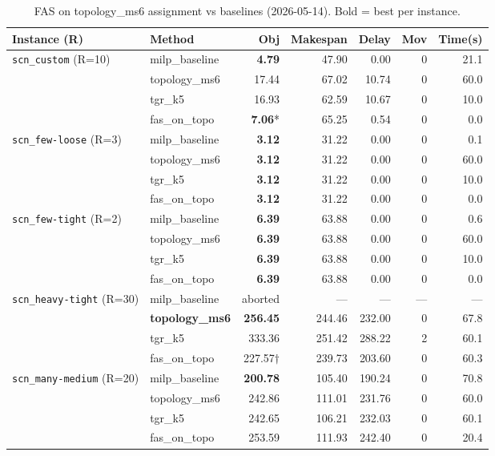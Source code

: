 \begin{table}[h]
\centering
\caption{FAS on topology\_ms6 assignment vs baselines (2026-05-14).  Bold = best per instance.}
\label{tab:exp03}
\begin{tabular}{llrrrrr}
\toprule
Instance (R) & Method & Obj & Makespan & Delay & Mov & Time(s) \\
\midrule
\multirow{4}{*}{\texttt{scn\_custom} (R=10)}
 & milp\_baseline & \textbf{4.79}  &  47.90 &  0.00 & 0 & 21.1 \\
 & topology\_ms6  & 17.44          &  67.02 & 10.74 & 0 & 60.0 \\
 & tgr\_k5        & 16.93          &  62.59 & 10.67 & 0 & 10.0 \\
 & fas\_on\_topo  & \textbf{7.06}* &  65.25 &  0.54 & 0 &  0.0 \\
\midrule
\multirow{4}{*}{\texttt{scn\_few-loose} (R=3)}
 & milp\_baseline & \textbf{3.12}  &  31.22 &  0.00 & 0 &  0.1 \\
 & topology\_ms6  & \textbf{3.12}  &  31.22 &  0.00 & 0 & 60.0 \\
 & tgr\_k5        & \textbf{3.12}  &  31.22 &  0.00 & 0 & 10.0 \\
 & fas\_on\_topo  & \textbf{3.12}  &  31.22 &  0.00 & 0 &  0.0 \\
\midrule
\multirow{4}{*}{\texttt{scn\_few-tight} (R=2)}
 & milp\_baseline & \textbf{6.39}  &  63.88 &  0.00 & 0 &  0.6 \\
 & topology\_ms6  & \textbf{6.39}  &  63.88 &  0.00 & 0 & 60.0 \\
 & tgr\_k5        & \textbf{6.39}  &  63.88 &  0.00 & 0 & 10.0 \\
 & fas\_on\_topo  & \textbf{6.39}  &  63.88 &  0.00 & 0 &  0.0 \\
\midrule
\multirow{3}{*}{\texttt{scn\_heavy-tight} (R=30)}
 & milp\_baseline & aborted         &     — &     — & — &    — \\
 & \textbf{topology\_ms6} & \textbf{256.45} & 244.46 & 232.00 & 0 & 67.8 \\
 & tgr\_k5        & 333.36          & 251.42 & 288.22 & 2 & 60.1 \\
 & fas\_on\_topo  & 227.57$\dagger$ & 239.73 & 203.60 & 0 & 60.3 \\
\midrule
\multirow{4}{*}{\texttt{scn\_many-medium} (R=20)}
 & milp\_baseline & \textbf{200.78} & 105.40 & 190.24 & 0 & 70.8 \\
 & topology\_ms6  & 242.86          & 111.01 & 231.76 & 0 & 60.0 \\
 & tgr\_k5        & 242.65          & 106.21 & 232.03 & 0 & 60.1 \\
 & fas\_on\_topo  & 253.59          & 111.93 & 242.40 & 0 & 20.4 \\
\bottomrule
\end{tabular}
\end{table}

